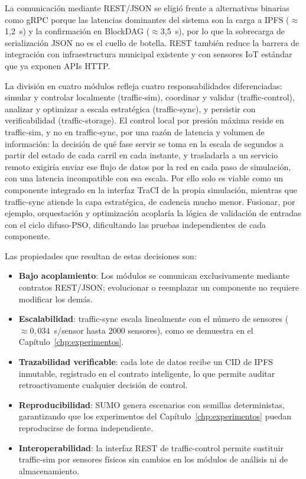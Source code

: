 La comunicación mediante REST/JSON se eligió frente a alternativas binarias como gRPC porque las latencias dominantes del sistema son la carga a IPFS ($\approx$1,2~s) y la confirmación en BlockDAG ($\approx$3,5~s), por lo que la sobrecarga de serialización JSON no es el cuello de botella. REST también reduce la barrera de integración con infraestructura municipal existente y con sensores IoT estándar que ya exponen APIs HTTP.

La división en cuatro módulos refleja cuatro responsabilidades diferenciadas: simular y controlar localmente (traffic-sim), coordinar y validar (traffic-control), analizar y optimizar a escala estratégica (traffic-sync), y persistir con verificabilidad (traffic-storage). El control local por presión máxima reside en traffic-sim, y no en traffic-sync, por una razón de latencia y volumen de información: la decisión de qué fase servir se toma en la escala de segundos a partir del estado de cada carril en cada instante, y trasladarla a un servicio remoto exigiría enviar ese flujo de datos por la red en cada paso de simulación, con una latencia incompatible con esa escala. Por ello solo es viable como un componente integrado en la interfaz TraCI de la propia simulación, mientras que traffic-sync atiende la capa estratégica, de cadencia mucho menor. Fusionar, por ejemplo, orquestación y optimización acoplaría la lógica de validación de entradas con el ciclo difuso-PSO, dificultando las pruebas independientes de cada componente.

Las propiedades que resultan de estas decisiones son:

\begin{itemize}
    \item \textbf{Bajo acoplamiento}: Los módulos se comunican exclusivamente mediante contratos REST/JSON; evolucionar o reemplazar un componente no requiere modificar los demás.

    \item \textbf{Escalabilidad}: traffic-sync escala linealmente con el número de sensores ($\approx 0{,}034$~s/sensor hasta 2000 sensores), como se demuestra en el Capítulo~\ref{chp:experimentos}.

    \item \textbf{Trazabilidad verificable}: cada lote de datos recibe un CID de IPFS inmutable, registrado en el contrato inteligente, lo que permite auditar retroactivamente cualquier decisión de control.

    \item \textbf{Reproducibilidad}: SUMO genera escenarios con semillas deterministas, garantizando que los experimentos del Capítulo~\ref{chp:experimentos} puedan reproducirse de forma independiente.

    \item \textbf{Interoperabilidad}: la interfaz REST de traffic-control permite sustituir traffic-sim por sensores físicos sin cambios en los módulos de análisis ni de almacenamiento.
\end{itemize}

